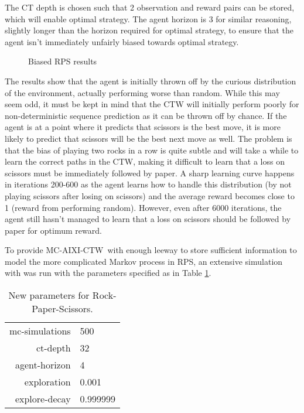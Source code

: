 \documentclass[pdftex,twoside,a4paper]{report}
\newcommand{\mac}{MC-AIXI-CTW}
\begin{document}
The CT depth is chosen such that 2 observation and reward pairs can be stored, which will enable optimal strategy. The agent horizon is 3 for similar reasoning, slightly longer than the horizon required for optimal strategy, to ensure that the agent isn't immediately unfairly biased towards optimal strategy.

\begin{figure}[h]
  \begin{center}
  \end{center}
  \caption{Biased RPS results}
  \label{fig:rps_results}
\end{figure}

The results show that the agent is initially thrown off by the curious distribution of the environment, actually performing worse than random. While this may seem odd, it must be kept in mind that the CTW will initially perform poorly for non-deterministic sequence prediction as it can be thrown off by chance. If the agent is at a point where it predicts that scissors is the best move, it is more likely to predict that scissors will be the best next move as well. The problem is that the bias of playing two rocks in a row is quite subtle and will take a while to learn the correct paths in the CTW, making it difficult to learn that a loss on scissors must be immediately followed by paper. A sharp learning curve happens in iterations 200-600 as the agent learns how to handle this distribution (by not playing scissors after losing on scissors) and the average reward becomes close to 1 (reward from performing random). However, even after 6000 iterations, the agent still hasn't managed to learn that a loss on scissors should be followed by paper for optimum reward.


To provide \mac\ with enough leeway to store sufficient information to model
the more complicated Markov process in RPS, an extensive simulation with was
run with the parameters specified as in Table \ref{tab:new_rps_params}.

\begin{table}
\begin{center}
\begin{tabular}{| r | l | }
\hline
mc-simulations & 500\\
ct-depth & 32\\
agent-horizon & 4\\
exploration & 0.001\\
explore-decay & 0.999999\\
\hline
\end{tabular}
\end{center}
\caption{New parameters for Rock-Paper-Scissors.}
\label{tab:new_rps_params}
\end{table}
\end{document}
